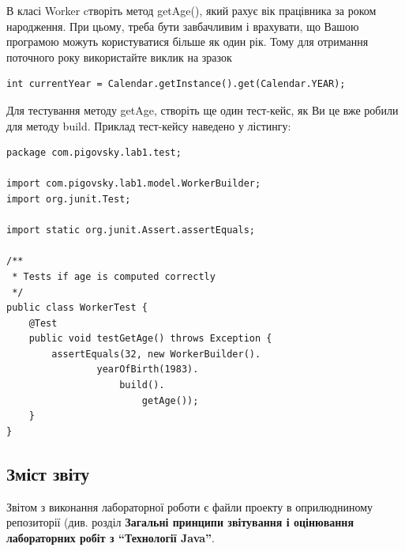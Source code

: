 В класі Worker cтворіть метод getAge(), який рахує вік працівника за роком народження. При цьому, треба бути завбачливим і врахувати, що Вашою програмою можуть користуватися більше як один рік. Тому для отримання поточного року використайте виклик на зразок
\begin{lstlisting}
int currentYear = Calendar.getInstance().get(Calendar.YEAR);
\end{lstlisting}

Для тестування методу getAge, створіть ще один тест-кейс, як Ви це вже робили для методу build. Приклад тест-кейсу наведено у лістингу:
\begin{lstlisting}
package com.pigovsky.lab1.test;

import com.pigovsky.lab1.model.WorkerBuilder;
import org.junit.Test;

import static org.junit.Assert.assertEquals;

/**
 * Tests if age is computed correctly
 */
public class WorkerTest {
    @Test
    public void testGetAge() throws Exception {
        assertEquals(32, new WorkerBuilder().
                yearOfBirth(1983).
                    build().
                        getAge());
    }
}
\end{lstlisting}

\subsection{Зміст звіту}

Звітом з виконання лабораторної роботи є файли проекту в оприлюдниному репозиторії (див. розділ {\bf Загальні принципи звітування і оцінювання лабораторних робіт з ``Технології Java''}.
 
